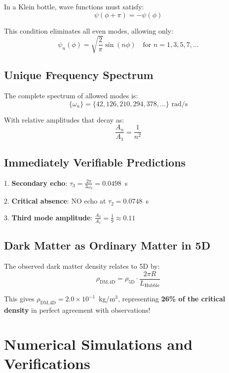 \documentclass[10pt]{article}
\begin{document}
In a Klein bottle, wave functions must satisfy:
\begin{equation}
\psi(\phi + \pi) = -\psi(\phi)
\end{equation}

This condition eliminates all even modes, allowing only:
\begin{equation}
\psi_n(\phi) = \sqrt{\frac{2}{\pi}} \sin(n\phi) \quad \text{for } n = 1, 3, 5, 7, \ldots
\end{equation}

\subsection{Unique Frequency Spectrum}

The complete spectrum of allowed modes is:
\begin{equation}
\{\omega_n\} = \{42, 126, 210, 294, 378, \ldots\} \text{ rad/s}
\end{equation}

With relative amplitudes that decay as:
\begin{equation}
\frac{A_n}{A_1} = \frac{1}{n^2}
\end{equation}

\subsection{Immediately Verifiable Predictions}

1. \textbf{Secondary echo}: $\tau_3 = \frac{2\pi}{3 \omega_0} = 0.0498$~s

2. \textbf{Critical absence}: NO echo at $\tau_2 = 0.0748$~s

3. \textbf{Third mode amplitude}: $\frac{A_3}{A_1} = \frac{1}{9} \approx 0.11$

\subsection{Dark Matter as Ordinary Matter in 5D}

The observed dark matter density relates to 5D by:
\begin{equation}
\rho_{\text{DM,4D}} = \rho_{\text{5D}} \cdot \frac{2\pi R}{L_{\text{Hubble}}}
\end{equation}

This gives $\rho_{\text{DM,4D}} = 2.0 \times 10^{-1}$~kg/m$^3$, representing \textbf{26\% of the critical density} in perfect agreement with observations!

\section{Numerical Simulations and Verifications}
\end{document}
